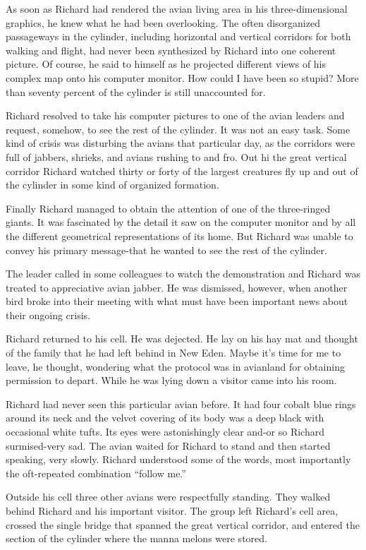 \documentclass[]{article}
\begin{document}
{As soon as Richard had rendered the avian living area in his three-dimensional graphics, he knew what he had been overlooking. The often disorganized passageways in the cylinder, including horizontal and vertical corridors for both walking and flight, had never been synthesized by Richard into one coherent picture. Of course, he said to himself as he projected different views of his complex map onto his computer monitor. How could I have been so stupid? More than seventy percent of the cylinder is still unaccounted for.

Richard resolved to take his computer pictures to one of the avian leaders and request, somehow, to see the rest of the cylinder. It was not an easy task. Some kind of crisis was disturbing the avians that particular day, as the corridors were full of jabbers, shrieks, and avians rushing to and fro. Out hi the great vertical corridor Richard watched thirty or forty of the largest creatures fly up and out of the cylinder in some kind of organized formation.

Finally Richard managed to obtain the attention of one of the three-ringed giants. It was fascinated by the detail it saw on the computer monitor and by all the different geometrical representations of its home. But Richard was unable to convey his primary message-that he wanted to see the rest of the cylinder.

The leader called in some colleagues to watch the demonstration and Richard was treated to appreciative avian jabber. He was dismissed, however, when another bird broke into their meeting with what must have been important news about their ongoing crisis.

Richard returned to his cell. He was dejected. He lay on his hay mat and thought of the family that he had left behind in New Eden. Maybe it’s time for me to leave, he thought, wondering what the protocol was in avianland for obtaining permission to depart. While he was lying down a visitor came into his room.

Richard had never seen this particular avian before. It had four cobalt blue rings around its neck and the velvet covering of its body was a deep black with occasional white tufts. Its eyes were astonishingly clear and-or so Richard surmised-very sad. The avian waited for Richard to stand and then started speaking, very slowly. Richard understood some of the words, most importantly the oft-repeated combination “follow me.”

Outside his cell three other avians were respectfully standing. They walked behind Richard and his important visitor. The group left Richard’s cell area, crossed the single bridge that spanned the great vertical corridor, and entered the section of the cylinder where the manna melons were stored.

}
\end{document}
